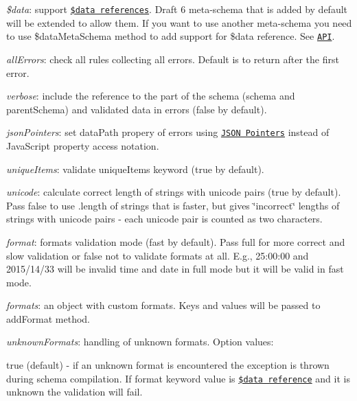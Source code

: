 \begin{DoxyItemize}
\item {\itshape \$data}\+: support \href{#data-reference}{\tt \$data references}. Draft 6 meta-\/schema that is added by default will be extended to allow them. If you want to use another meta-\/schema you need to use \$data\+Meta\+Schema method to add support for \$data reference. See \href{#api}{\tt A\+PI}.
\item {\itshape all\+Errors}\+: check all rules collecting all errors. Default is to return after the first error.
\item {\itshape verbose}\+: include the reference to the part of the schema ({\ttfamily schema} and {\ttfamily parent\+Schema}) and validated data in errors (false by default).
\item {\itshape json\+Pointers}\+: set {\ttfamily data\+Path} propery of errors using \href{https://tools.ietf.org/html/rfc6901}{\tt J\+S\+ON Pointers} instead of Java\+Script property access notation.
\item {\itshape unique\+Items}\+: validate {\ttfamily unique\+Items} keyword (true by default).
\item {\itshape unicode}\+: calculate correct length of strings with unicode pairs (true by default). Pass {\ttfamily false} to use {\ttfamily .length} of strings that is faster, but gives \char`\"{}incorrect\char`\"{} lengths of strings with unicode pairs -\/ each unicode pair is counted as two characters.
\item {\itshape format}\+: formats validation mode (\textquotesingle{}fast\textquotesingle{} by default). Pass \textquotesingle{}full\textquotesingle{} for more correct and slow validation or {\ttfamily false} not to validate formats at all. E.\+g., 25\+:00\+:00 and 2015/14/33 will be invalid time and date in \textquotesingle{}full\textquotesingle{} mode but it will be valid in \textquotesingle{}fast\textquotesingle{} mode.
\item {\itshape formats}\+: an object with custom formats. Keys and values will be passed to {\ttfamily add\+Format} method.
\item {\itshape unknown\+Formats}\+: handling of unknown formats. Option values\+:
\begin{DoxyItemize}
\item {\ttfamily true} (default) -\/ if an unknown format is encountered the exception is thrown during schema compilation. If {\ttfamily format} keyword value is \href{#data-reference}{\tt \$data reference} and it is unknown the validation will fail.

\end{DoxyItemize}
\end{DoxyItemize}
